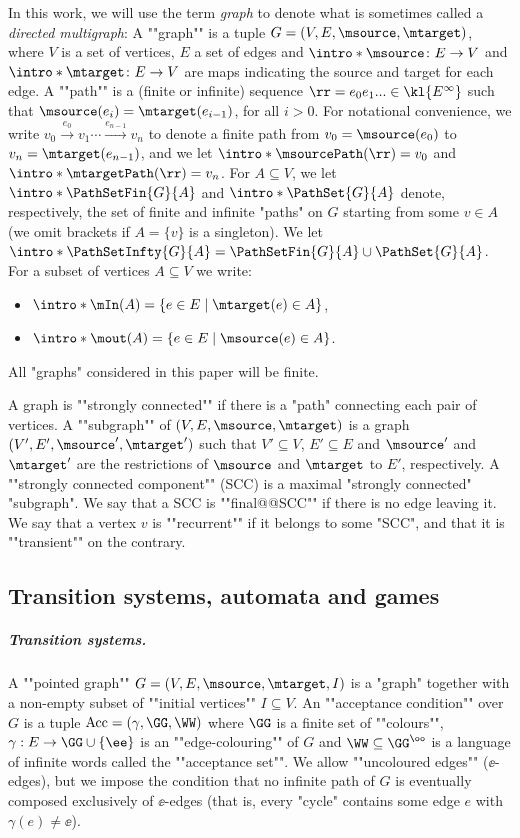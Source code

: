 \documentclass[10pt,a4paper]{amsart}
\renewcommand{\gg}{\gamma}
\newcommand{\re}[1]{\xrightarrow{#1}}
\begin{document}
\AP In this work, we will use the term \emph{graph} to denote what is sometimes called a \emph{directed multigraph}: A ""graph"" is a tuple $G=(V,E,\msource,\mtarget)$, where $V$ is a set of vertices, $E$ a set of edges and $\intro*\msource\colon E\to  V$ and $\intro*\mtarget\colon E\to  V$ are maps indicating the source and target for each edge. 
\AP A ""path"" is a (finite or infinite) sequence $\rr = e_0e_1...\in \kl{E^\infty}$ such that  $\msource(e_{i})=\mtarget(e_{i-1})$, for all $i>0$. For notational convenience, we  write $v_0 \re {e_0} v_1 \cdots  \re{e_{n-1}} v_n$ to denote a finite path from $v_0 = \msource(e_0)$ to $v_n = \mtarget(e_{n-1})$, and we let $\intro*\msourcePath(\rr) = v_0$ and $\intro*\mtargetPath(\rr) = v_n$.
\AP For $A\subseteq V$, we let $\intro*\PathSetFin{G}{A}$ and $\intro*\PathSet{G}{A}$ denote, respectively, the set of finite and infinite "paths"  on $G$ starting from some $v\in A$ (we omit brackets if $A=\{v\}$ is a singleton).  We let $\intro*\PathSetInfty{G}{A} = \PathSetFin{G}{A}\cup \PathSet{G}{A}$.
\AP For a subset of vertices $A\subseteq V$ we write:
\begin{itemize}
	\item $\intro*\mIn(A)=\{ e\in E \mid \mtarget(e)\in A \}$,
	\item $\intro*\mout(A)=\{ e\in E \mid \msource(e)\in A \}$.
\end{itemize}



All "graphs" considered in this paper will be finite.

\AP A graph is ""strongly connected"" if there is a "path" connecting each pair of vertices. \AP A ""subgraph"" of $(V,E,\msource,\mtarget)$ is a graph $(V',E',\msource',\mtarget')$ such that $V'\subseteq V$, $E'\subseteq E$ and $\msource'$ and $\mtarget'$ are the restrictions  of $\msource$ and $\mtarget$ to $E'$, respectively. A ""strongly connected component"" (SCC) is a maximal "strongly connected" "subgraph". We say that a SCC is ""final@@SCC"" if there is no edge leaving it.
\AP We say that a vertex $v$ is ""recurrent"" if it belongs to some "SCC", and that it is ""transient"" on the contrary.




\subsection{Transition systems, automata and games}\label{subsect-prelim:transition-systems}

\subparagraph*{Transition systems.}
\AP A ""pointed graph"" $G = (V,E, \msource, \mtarget, I)$ is a "graph" %
 together with a non-empty subset of ""initial vertices"" $I\subseteq V$.
\AP An ""acceptance condition"" over $G$ is a tuple $\mathrm{Acc} = (\gg, \GG, \WW)$ where $\GG$ is a finite set of ""colours"", $\gg:E\to \GG\cup\{\ee\}$ is an ""edge-colouring"" of $G$ and $\WW\subseteq \GG^\oo$ is a language of infinite words called the ""acceptance set"". We allow ""uncoloured edges"" ($\ee$-edges), but we impose the condition that no infinite path of $G$ is eventually composed exclusively of $\ee$-edges (that is, every "cycle" contains some edge $e$ with $\gg(e)\neq \ee$). 
\end{document}

